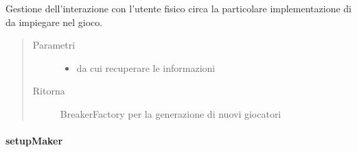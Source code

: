 \documentclass[letterpaper,10pt,italian,openany,oneside]{sphinxmanual}
\begin{document}
\begin{fulllineitems}
\label{\detokenize{source/it/unicam/cs/pa/mastermind/ui/StartView:it.unicam.cs.pa.mastermind.ui.StartView.setupBreaker(BreakerFactoryRegistry)}}
Gestione dell’interazione con l’utente fisico circa la particolare implementazione di  da impiegare nel gioco.
\begin{quote}\begin{description}
\item[{Parametri}] \leavevmode\begin{itemize}
\item {} 
 \textendash{} da cui recuperare le informazioni

\end{itemize}

\item[{Ritorna}] \leavevmode
BreakerFactory per la generazione di nuovi giocatori 

\end{description}\end{quote}

\end{fulllineitems}



\paragraph{setupMaker}
\label{\detokenize{source/it/unicam/cs/pa/mastermind/ui/StartView:setupmaker}}
\end{document}
